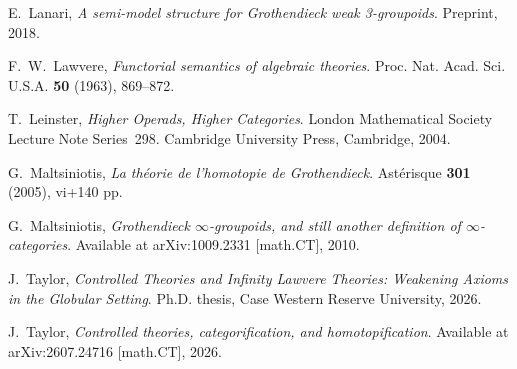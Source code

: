 \documentclass{tac}
\begin{document}
\begin{references*}
E.~Lanari,
\emph{A semi-model structure for Grothendieck weak 3-groupoids}.
Preprint, 2018.

F.~W.~Lawvere,
\emph{Functorial semantics of algebraic theories}.
Proc. Nat. Acad. Sci. U.S.A.
\textbf{50} (1963), 869--872.

T.~Leinster,
\emph{Higher Operads, Higher Categories}.
London Mathematical Society Lecture Note Series~298.
Cambridge University Press, Cambridge, 2004.


G.~Maltsiniotis,
\emph{La th\'eorie de l'homotopie de Grothendieck}.
Ast\'erisque \textbf{301} (2005), vi+140 pp.

G.~Maltsiniotis,
\emph{Grothendieck $\infty$-groupoids, and still another definition of
$\infty$-categories}.
Available at arXiv:1009.2331 [math.CT], 2010.


J.~Taylor,
\emph{Controlled Theories and Infinity Lawvere Theories:
Weakening Axioms in the Globular Setting}.
Ph.D. thesis,
Case Western Reserve University,
2026.

J.~Taylor,
\emph{Controlled theories, categorification, and homotopification}.
Available at arXiv:2607.24716 [math.CT], 2026.
\end{references*}
\end{document}
